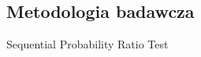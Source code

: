 \subsection{Metodologia badawcza}
\label{subsec:metodologia-badawcza}

Sequential Probability Ratio Test

